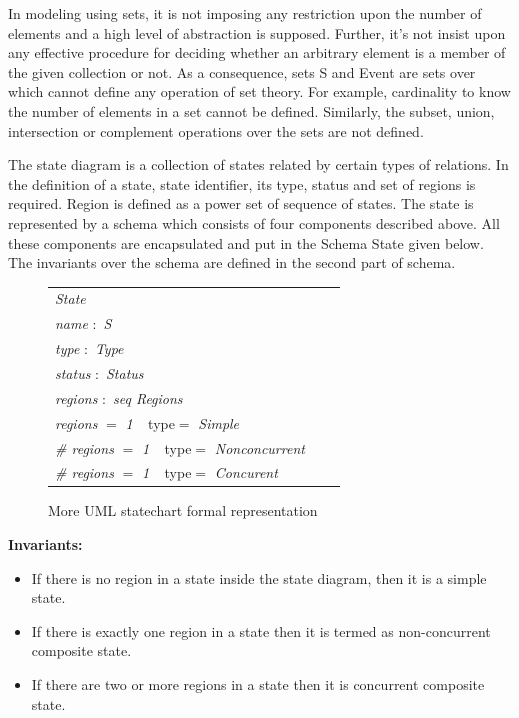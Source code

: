 In modeling using sets, it is not imposing any restriction upon the number of elements and a high level of
abstraction is supposed. Further, it's not insist upon any
effective procedure for deciding whether an arbitrary
element is a member of the given collection or not. As a
consequence, sets S and Event are sets over which cannot define any operation of set theory. For example,
cardinality to know the number of elements in a set cannot
be defined. Similarly, the subset, union, intersection or
complement operations over the sets are not defined.

The state diagram is a collection of states related by
certain types of relations. In the definition of a state, state identifier, its type, status and set of regions is required. Region is defined as a power set of sequence of states. The state is represented by a schema which consists of four components described above. All these components are encapsulated and put in the Schema State given below.
The invariants over the schema are defined in the second
part of schema.

\begin{figure}[ht!]
	\centering
	\begin{tabular}{lll}
		\footnotesize                       
		\textit{State}       \\
		
		\footnotesize
		\textit{name}   $:$    \textit{S}  \\   
		\footnotesize
		\textit{type}   $:$    \textit{Type}  \\   
		\footnotesize
		\textit{status}   $:$    \textit{Status}      \\
		\footnotesize
		\textit{regions} $:$   \textit{seq Regions} \\
		
		\footnotesize
		\textit{regions} $=$   \textit{1} $\ \  $ {type}$=$   \textit{Simple} \\
		\footnotesize
		 \textit{\# regions} $=$   \textit{1} $\ \  $ {type}$=$   \textit{Nonconcurrent} \\
		 \textit{\# regions} $=$   \textit{1} $\ \  $ {type}$=$   \textit{Concurent} \\
		 
		
	\end{tabular}
	\vspace{1em}
	\caption{More UML statechart formal representation}
	\label{statechart_formal_representation_part2}
\end{figure}

\textbf{Invariants:}
\begin{itemize}
\item  If there is no region in a state inside the state diagram, then it is a simple state.
\item  If there is exactly one region in a state then it is termed as non-concurrent composite state.
\item  If there are two or more regions in a state then it is
concurrent composite state.
\end{itemize}


